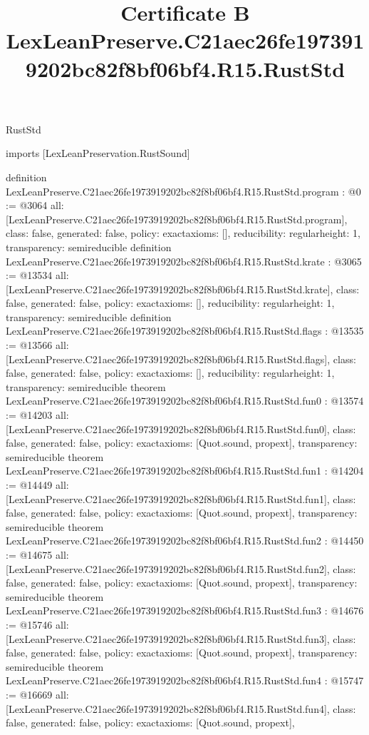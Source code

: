 \begin{lexlean}{RustStd}
\title{Certificate B LexLeanPreserve.C21aec26fe1973919202bc82f8bf06bf4.R15.RustStd}
\begin{coremodule}
imports [LexLeanPreservation.RustSound]

definition LexLeanPreserve.C21aec26fe1973919202bc82f8bf06bf4.R15.RustStd.program : @0 := @3064 {
  all: [LexLeanPreserve.C21aec26fe1973919202bc82f8bf06bf4.R15.RustStd.program],
  class: false,
  generated: false,
  policy: exact{axioms: []},
  reducibility: regular{height: 1},
  transparency: semireducible
}
definition LexLeanPreserve.C21aec26fe1973919202bc82f8bf06bf4.R15.RustStd.krate : @3065 := @13534 {
  all: [LexLeanPreserve.C21aec26fe1973919202bc82f8bf06bf4.R15.RustStd.krate],
  class: false,
  generated: false,
  policy: exact{axioms: []},
  reducibility: regular{height: 1},
  transparency: semireducible
}
definition LexLeanPreserve.C21aec26fe1973919202bc82f8bf06bf4.R15.RustStd.flags : @13535 := @13566 {
  all: [LexLeanPreserve.C21aec26fe1973919202bc82f8bf06bf4.R15.RustStd.flags],
  class: false,
  generated: false,
  policy: exact{axioms: []},
  reducibility: regular{height: 1},
  transparency: semireducible
}
theorem LexLeanPreserve.C21aec26fe1973919202bc82f8bf06bf4.R15.RustStd.fun0 : @13574 := @14203 {
  all: [LexLeanPreserve.C21aec26fe1973919202bc82f8bf06bf4.R15.RustStd.fun0],
  class: false,
  generated: false,
  policy: exact{axioms: [Quot.sound, propext]},
  transparency: semireducible
}
theorem LexLeanPreserve.C21aec26fe1973919202bc82f8bf06bf4.R15.RustStd.fun1 : @14204 := @14449 {
  all: [LexLeanPreserve.C21aec26fe1973919202bc82f8bf06bf4.R15.RustStd.fun1],
  class: false,
  generated: false,
  policy: exact{axioms: [Quot.sound, propext]},
  transparency: semireducible
}
theorem LexLeanPreserve.C21aec26fe1973919202bc82f8bf06bf4.R15.RustStd.fun2 : @14450 := @14675 {
  all: [LexLeanPreserve.C21aec26fe1973919202bc82f8bf06bf4.R15.RustStd.fun2],
  class: false,
  generated: false,
  policy: exact{axioms: [Quot.sound, propext]},
  transparency: semireducible
}
theorem LexLeanPreserve.C21aec26fe1973919202bc82f8bf06bf4.R15.RustStd.fun3 : @14676 := @15746 {
  all: [LexLeanPreserve.C21aec26fe1973919202bc82f8bf06bf4.R15.RustStd.fun3],
  class: false,
  generated: false,
  policy: exact{axioms: [Quot.sound, propext]},
  transparency: semireducible
}
theorem LexLeanPreserve.C21aec26fe1973919202bc82f8bf06bf4.R15.RustStd.fun4 : @15747 := @16669 {
  all: [LexLeanPreserve.C21aec26fe1973919202bc82f8bf06bf4.R15.RustStd.fun4],
  class: false,
  generated: false,
  policy: exact{axioms: [Quot.sound, propext]},
}
\end{coremodule}
\end{lexlean}
